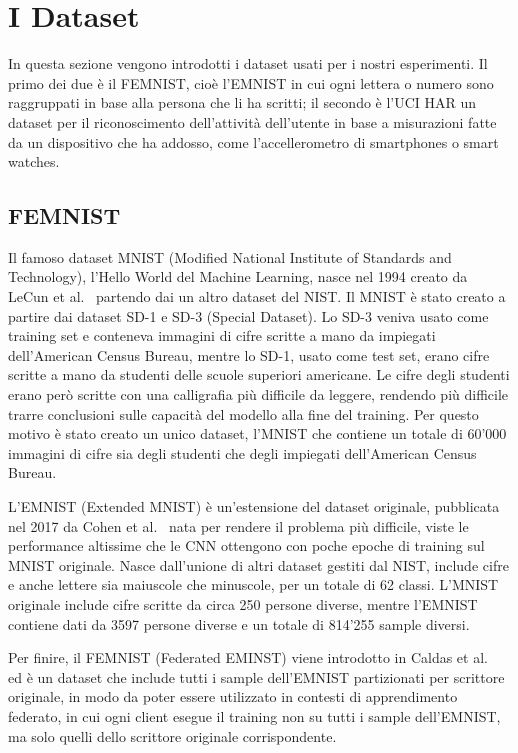 \chapter{I Dataset}
In questa sezione vengono introdotti i dataset usati per i nostri
esperimenti. Il primo dei due è il FEMNIST, cioè l'EMNIST 
in cui ogni lettera o numero sono raggruppati in base alla 
persona che li ha scritti; il secondo è l'UCI HAR un dataset per il
riconoscimento dell'attività dell'utente in base a misurazioni fatte
da un dispositivo che ha addosso, come l'accellerometro di smartphones
o smart watches.

\section{FEMNIST}
Il famoso dataset MNIST (Modified National Institute of Standards and
Technology), l'Hello World del Machine Learning, nasce nel 1994 creato 
da LeCun et al.~\cite{lecun1998mnist} partendo dai un altro dataset 
del NIST.
Il MNIST è stato creato a partire dai dataset SD-1 e SD-3 (Special
Dataset). Lo SD-3 veniva usato come training set e conteneva immagini
di cifre scritte a mano da impiegati dell'American Census Bureau,
mentre lo SD-1, usato come test set, erano cifre scritte a mano da 
studenti delle scuole superiori americane. Le cifre degli studenti
erano però scritte con una calligrafia più difficile da leggere, rendendo più 
difficile trarre conclusioni sulle capacità del modello alla fine del
training. Per questo motivo è stato creato un unico dataset, l'MNIST 
che contiene un totale di 60'000 immagini di cifre sia degli studenti
che degli impiegati dell'American Census Bureau.

L'EMNIST (Extended MNIST) è un'estensione del dataset originale,
pubblicata nel 2017 da Cohen et al.~\cite{cohen2017emnist} nata 
per rendere il problema più difficile, viste le performance altissime
che le CNN ottengono con poche epoche di training sul MNIST originale.
Nasce dall'unione di altri dataset gestiti dal NIST, include cifre e
anche lettere sia maiuscole che minuscole, per un totale di 62 classi.
L'MNIST originale include cifre scritte da circa 250 persone diverse,
mentre l'EMNIST contiene dati da 3597 persone diverse e un totale di 
814'255 sample diversi.

Per finire, il FEMNIST (Federated EMINST)
viene introdotto in Caldas et al.~\cite{caldas2019femnist}
ed è un dataset che include tutti i sample dell'EMNIST partizionati
per scrittore originale, in modo da poter essere utilizzato in contesti
di apprendimento federato, in cui ogni client esegue il training non su
tutti i sample dell'EMNIST, ma solo quelli dello scrittore originale
corrispondente.


